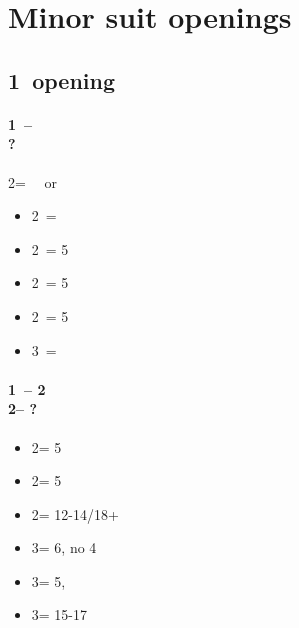 \documentclass[12pt, a4paper]{report}
\begin{document}
\chapter*{\colorbox{Plum!30}{Minor suit openings}}

\section*{\colorbox{blue!30}{1\clubs\ opening}}
 {

    \subsubsection*{1\clubs\ -- \alrts{2\clubs} \\ ?}
    2\clubs = \gf\ \nat\ or \bal
    \begin{itemize}
        \item 2\diams\ = \bal
        \item 2\hearts\ = 5\hearts
        \item 2\spades\ = 5\spades
        \item 2\nt\ = 5\diams
        \item 3\clubs\ = \clubs
    \end{itemize}

    \subsubsection*{1\clubs\ -- 2\clubs \\
                2\diams -- ?}
    \begin{itemize}
        \item 2\hearts = 5\hearts
        \item 2\spades = 5\spades
        \item 2\nt = 12-14/18+ \bal
        \item 3\clubs = 6\clubs, no 4\major
        \item 3\diams = 5\diams, \gf
        \item 3\nt = 15-17 \bal
    \end{itemize}
}
\end{document}
